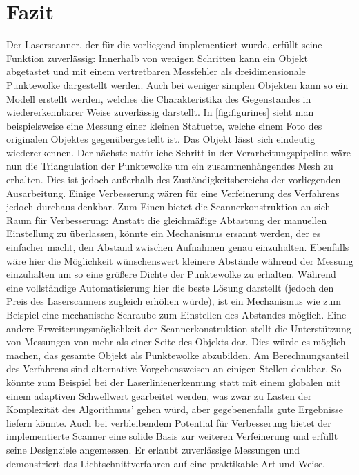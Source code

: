 \chapter{Fazit}
Der Laserscanner, der für die vorliegend implementiert wurde, erfüllt seine Funktion zuverlässig: Innerhalb von wenigen Schritten kann ein Objekt abgetastet und mit einem vertretbaren Messfehler als dreidimensionale Punktewolke dargestellt werden. Auch bei weniger simplen Objekten kann so ein Modell erstellt werden, welches die Charakteristika des Gegenstandes in wiedererkennbarer Weise zuverlässig darstellt. In \ref{fig:figurines} sieht man beispielsweise eine Messung einer kleinen Statuette, welche einem Foto des originalen Objektes gegenübergestellt ist. Das Objekt lässt sich eindeutig wiedererkennen. Der nächste natürliche Schritt in der Verarbeitungspipeline wäre nun die Triangulation der Punktewolke um ein zusammenhängendes Mesh zu erhalten. Dies ist jedoch außerhalb des Zu\-stän\-dig\-keits\-bereichs der vorliegenden Ausarbeitung.\newline
Einige Verbesserung wären für eine Verfeinerung des Verfahrens jedoch durchaus denkbar. Zum Einen bietet die Scannerkonstruktion an sich Raum für Verbesserung: Anstatt die gleichmäßige Abtastung der manuellen Einstellung zu überlassen, könnte ein Mechanismus ersannt werden, der es einfacher macht, den Abstand zwischen Aufnahmen genau einzuhalten. Ebenfalls wäre hier die Möglichkeit wünschenswert kleinere Abstände während der Messung einzuhalten um so eine größere Dichte der Punktewolke zu erhalten. Während eine vollständige Automatisierung hier die beste Lösung darstellt (jedoch den Preis des Laserscanners zugleich erhöhen würde), ist ein Mechanismus wie zum Beispiel eine mechanische Schraube zum Einstellen des Abstandes möglich. Eine andere Erweiterungsmöglichkeit der Scannerkonstruktion stellt die Unterstützung von Messungen von mehr als einer Seite des Objekts dar. Dies würde es möglich machen, das gesamte Objekt als Punktewolke abzubilden. Am Berechnungsanteil des Verfahrens sind alternative Vorgehensweisen an einigen Stellen denkbar. So könnte zum Beispiel bei der Laserlinienerkennung statt mit einem globalen mit einem adaptiven Schwellwert gearbeitet werden, was zwar zu Lasten der Komplexität des Algorithmus' gehen würd, aber gegebenenfalls gute Ergebnisse liefern könnte. \newline
Auch bei verbleibendem Potential für Verbesserung bietet der implementierte Scanner eine solide Basis zur weiteren Verfeinerung und erfüllt seine Designziele angemessen. Er erlaubt zuverlässige Messungen und demonstriert das Lichtschnittverfahren auf eine praktikable Art und Weise. 

